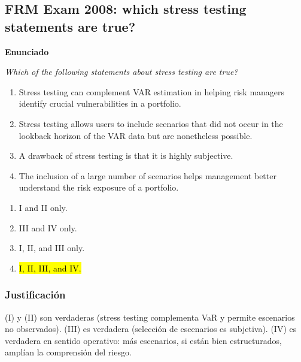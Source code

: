 ﻿\subsection{FRM Exam 2008: which stress testing statements are true?}

\textbf{Enunciado}

\emph{Which of the following statements about stress testing are true?}
\begin{enumerate}[label=\Roman*.]
\item Stress testing can complement VAR estimation in helping risk managers identify crucial vulnerabilities in a portfolio.
\item Stress testing allows users to include scenarios that did not occur in the lookback horizon of the VAR data but are nonetheless possible.
\item A drawback of stress testing is that it is highly subjective.
\item The inclusion of a large number of scenarios helps management better understand the risk exposure of a portfolio.
\end{enumerate}
\begin{enumerate}[label=\alph*.]
\item I and II only.
\item III and IV only.
\item I, II, and III only.
\item \hl{I, II, III, and IV.}
\end{enumerate}

\subsubsection*{Justificación}

(I) y (II) son verdaderas (stress testing complementa VaR y permite escenarios no observados). (III) es verdadera (selección de escenarios es subjetiva). (IV) es verdadera en sentido operativo: más escenarios, si están bien estructurados, amplían la comprensión del riesgo.











